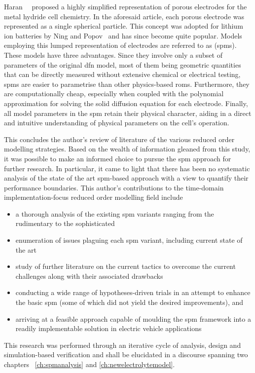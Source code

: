 Haran~\etal{}~\cite{Haran1998}  proposed a  highly simplified  representation of
porous  electrodes  for the  metal  hydride  cell  chemistry. In  the  aforesaid
article,  each   porous  electrode  was   represented  as  a   single  spherical
particle.  This concept  was  adopted  for lithium  ion  batteries  by Ning  and
Popov~\cite{Ning2004} and has since become  quite popular. Models employing this
lumped  representation  of  electrodes  are referred  to  as  
(\glspl{spm}).  These models  have  three advantages.  Since  they involve  only
a  subset  of  parameters  of  the   original  \gls{dfn}  model,  most  of  them
being  geometric quantities  that  can be  directly  measured without  extensive
chemical  or electrical  testing,  \glspl{spm} are  easier  to parametrise  than
other physics-based  \glspl{rom}. Furthermore,  they are  computationally cheap,
especially when coupled with the  polynomial approximation for solving the solid
diffusion  equation for  each electrode.  Finally, all  model parameters  in the
\gls{spm}  retain their  physical character,  aiding in  a direct  and intuitive
understanding of physical parameters on the cell's operation.

This concludes  the author's review of  literature of the various  reduced order
modelling  strategies. Based  on the  wealth  of information  gleaned from  this
study,  it was  possible to  make  an informed  choice to  pursue the  \gls{spm}
approach  for further  research.  In particular,  it came  to  light that  there
has  been  no systematic  analysis  of  the  state  of the  art  \gls{spm}-based
approach with  a view  to quantify their  performance boundaries.  This author's
contributions to  the time-domain  implementation-focus reduced  order modelling
field include
\begin{itemize}[noitemsep,topsep=0pt, before={\vspace*{-0.25\baselineskip}}]
    \item a thorough analysis of the existing \gls{spm} variants ranging from the rudimentary to the sophisticated
    \item enumeration of issues plaguing each \gls{spm} variant, including current state of the art
    \item study of further literature on the current tactics to overcome the current challenges along with their associated drawbacks
    \item conducting a  wide range of hypotheses-driven trials in an attempt to enhance  the basic \gls{spm} (some of which did not yield the desired
        improvements), and
    \item arriving at  a  feasible  approach  capable  of  moulding  the
        \gls{spm}  framework into  a  readily implementable  solution in
        electric vehicle applications
\end{itemize}
This research was  performed through an iterative cycle of  analysis, design and
simulation-based verification  and shall be  elucidated in a  discourse spanning
two chapters \viz~\cref{ch:spmanalysis} and \cref{ch:newelectrolytemodel}.


